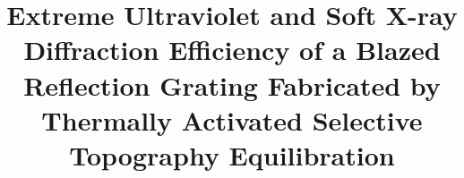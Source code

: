 \documentclass{aastex63}
\begin{document}
\title{Extreme Ultraviolet and Soft X-ray Diffraction Efficiency of a Blazed Reflection Grating Fabricated by Thermally Activated Selective Topography Equilibration}


\end{document}
